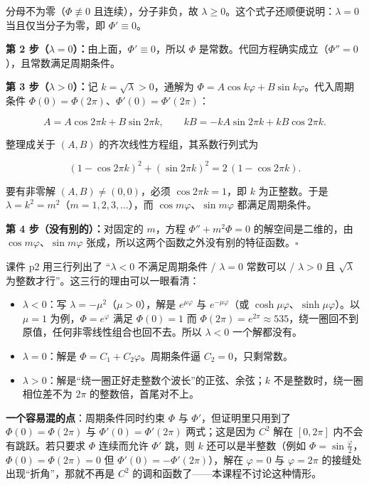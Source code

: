 \documentclass[11pt]{ctexart}
\let\origsubhdr\subhdr
\renewcommand{\subhdr}[1]{\par\needspace{3\baselineskip}\origsubhdr{#1}}
\begin{document}
分母不为零（$\Phi\not\equiv0$ 且连续），分子非负，故 $\lambda\ge0$。这个式子还顺便说明：$\lambda=0$ 当且仅当分子为零，即 $\Phi'\equiv0$。

\textbf{第 2 步（$\lambda=0$）：}由上面，$\Phi'\equiv0$，所以 $\Phi$ 是常数。代回方程确实成立（$\Phi''=0$），且常数满足周期条件。

\textbf{第 3 步（$\lambda>0$）：}记 $k=\sqrt\lambda>0$，通解为 $\Phi=A\cos k\varphi+B\sin k\varphi$。代入周期条件 $\Phi(0)=\Phi(2\pi)$、$\Phi'(0)=\Phi'(2\pi)$：

\[
A=A\cos2\pi k+B\sin2\pi k,\qquad kB=-kA\sin2\pi k+kB\cos2\pi k .
\]

整理成关于 $(A,B)$ 的齐次线性方程组，其系数行列式为

\[
(1-\cos2\pi k)^2+(\sin2\pi k)^2=2\,(1-\cos2\pi k).
\]

要有非零解 $(A,B)\ne(0,0)$，必须 $\cos2\pi k=1$，即 $k$ 为正整数。于是 $\lambda=k^2=m^2$（$m=1,2,3,\dots$），而 $\cos m\varphi$、$\sin m\varphi$ 都满足周期条件。

\textbf{第 4 步（没有别的）：}对固定的 $m$，方程 $\Phi''+m^2\Phi=0$ 的解空间是二维的，由 $\cos m\varphi$、$\sin m\varphi$ 张成，所以这两个函数之外没有别的特征函数。$\square$


课件 p2 用三行列出了 “$\lambda<0$ 不满足周期条件 / $\lambda=0$ 常数可以 / $\lambda>0$ 且 $\sqrt\lambda$ 为整数才行”。这三行的理由可以一眼看清：

\begin{itemize}
  \item $\lambda<0$：写 $\lambda=-\mu^2$（$\mu>0$），解是 $e^{\mu\varphi}$ 与 $e^{-\mu\varphi}$（或 $\cosh\mu\varphi$、$\sinh\mu\varphi$）。以 $\mu=1$ 为例，$\Phi=e^{\varphi}$ 满足 $\Phi(0)=1$ 而 $\Phi(2\pi)=e^{2\pi}\approx535$，绕一圈回不到原值，任何非零线性组合也回不去。所以 $\lambda<0$ 一个解都没有。
  \item $\lambda=0$：解是 $\Phi=C_1+C_2\varphi$。周期条件逼 $C_2=0$，只剩常数。
  \item $\lambda>0$：解是“绕一圈正好走整数个波长”的正弦、余弦；$k$ 不是整数时，绕一圈相位差不为 $2\pi$ 的整数倍，首尾对不上。
\end{itemize}

\textbf{一个容易混的点}：周期条件同时约束 $\Phi$ 与 $\Phi'$，但证明里只用到了 $\Phi(0)=\Phi(2\pi)$ 与 $\Phi'(0)=\Phi'(2\pi)$ 两式；这是因为 $C^2$ 解在 $[0,2\pi]$ 内不会有跳跃。若只要求 $\Phi$ 连续而允许 $\Phi'$ 跳，则 $k$ 还可以是半整数（例如 $\Phi=\sin\frac\varphi2$，$\Phi(0)=\Phi(2\pi)=0$ 但 $\Phi'(0)=-\Phi'(2\pi)$），解在 $\varphi=0$ 与 $\varphi=2\pi$ 的接缝处出现“折角”，那就不再是 $C^2$ 的调和函数了——本课程不讨论这种情形。
\end{document}
